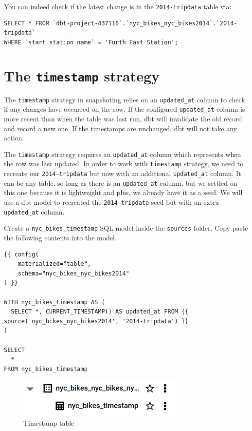 \documentclass[
]{book}
\begin{document}
You can indeed check if the latest change is in the \texttt{2014-tripdata} table via:

\begin{verbatim}
SELECT * FROM `dbt-project-437116`.`nyc_bikes_nyc_bikes2014`.`2014-tripdata`
WHERE `start station name` = 'Furth East Station';
\end{verbatim}

\hypertarget{the-timestamp-strategy}{%
\section{\texorpdfstring{The \texttt{timestamp} strategy}{The timestamp strategy}}\label{the-timestamp-strategy}}

The \texttt{timestamp} strategy in snapshoting relies on an \texttt{updated\_at} column to check if any changes have occurred on the row. If the configured \texttt{updated\_at} column is more recent than when the table was last run, dbt will invalidate the old record and record a new one. If the timestamps are unchanged, dbt will not take any action.

The \texttt{timestamp} strategy requires an \texttt{updated\_at} column which represents when the row was last updated. In order to work with \texttt{timestamp} strategy, we need to recreate our \texttt{2014-tripdata} but now with an additional \texttt{updated\_at} column. It can be any table, so long as there is an \texttt{updated\_at} column, but we settled on this one because it is lightweight and plus, we already have it as a seed. We will use a dbt model to recreated the \texttt{2014-tripdata} seed but with an extra \texttt{updated\_at} column.

Create a \texttt{nyc\_bikes\_timestamp} SQL model inside the \texttt{sources} folder. Copy paste the following contents into the model.

\begin{verbatim}
{{ config(
    materialized="table",
    schema="nyc_bikes_nyc_bikes2014"
) }}

WITH nyc_bikes_timestamp AS (
  SELECT *, CURRENT_TIMESTAMP() AS updated_at FROM {{ source('nyc_bikes_nyc_bikes2014', '2014-tripdata') }}
)

SELECT
  *
FROM nyc_bikes_timestamp
\end{verbatim}

\begin{figure}
\centering
\includegraphics{./images/timestamp_table.png}
\caption{Timestamp table}
\end{figure}
\end{document}
